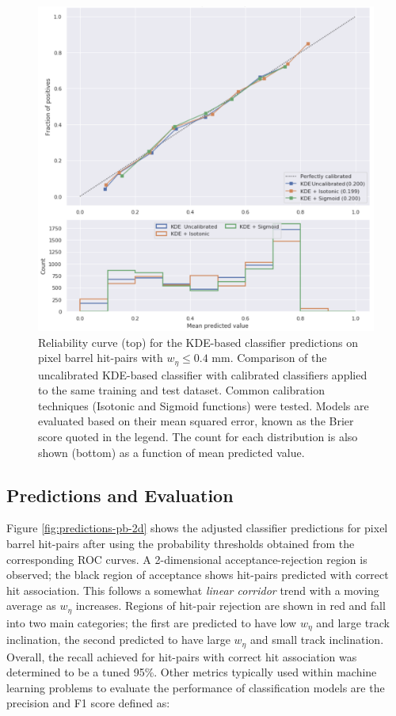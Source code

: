 \begin{figure}[!htbp]
\centering
\includegraphics[width=1.0\linewidth]{images/4-ml-based-predictor/calibration2.png}
\caption{Reliability curve (top) for the KDE-based classifier predictions on pixel barrel hit-pairs with $ w_{\eta} \leq 0.4$ mm. Comparison of the uncalibrated KDE-based classifier with calibrated classifiers applied to the same training and test dataset. Common calibration techniques (Isotonic and Sigmoid functions) were tested. Models are evaluated based on their mean squared error, known as the Brier score quoted in the legend. The count for each distribution is also shown (bottom) as a function of mean predicted value.}
\label{fig:calibration}
\end{figure}


\subsection{Predictions and Evaluation}

Figure \ref{fig:predictions-pb-2d} shows the adjusted classifier predictions for pixel barrel hit-pairs after using the probability thresholds obtained from the corresponding ROC curves. A 2-dimensional acceptance-rejection region is observed; the black region of acceptance shows hit-pairs predicted with correct hit association. This follows a somewhat \textit{linear corridor} trend with a moving average as $w_{\eta}$ increases. Regions of hit-pair rejection are shown in red and fall into two main categories; the first are predicted to have low $w_{\eta}$ and large track inclination, the second predicted to have large $w_{\eta}$ and small track inclination. Overall, the recall achieved for hit-pairs with correct hit association was determined to be a tuned 95\%. Other metrics typically used within machine learning problems to evaluate the performance of classification models are the precision and F1 score defined as:


